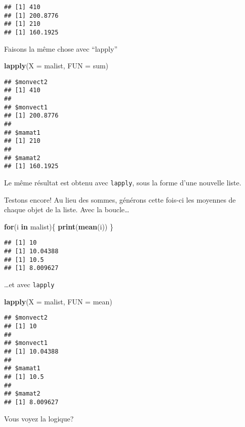 \documentclass[]{book}
\newenvironment{Shaded}{\begin{snugshade}}{\end{snugshade}}
\newcommand{\KeywordTok}[1]{\textcolor[rgb]{0.13,0.29,0.53}{\textbf{#1}}}
\newcommand{\DataTypeTok}[1]{\textcolor[rgb]{0.13,0.29,0.53}{#1}}
\newcommand{\ControlFlowTok}[1]{\textcolor[rgb]{0.13,0.29,0.53}{\textbf{#1}}}
\newcommand{\NormalTok}[1]{#1}
\begin{document}
\begin{verbatim}
## [1] 410
## [1] 200.8776
## [1] 210
## [1] 160.1925
\end{verbatim}

Faisons la même chose avec ``lapply''

\begin{Shaded}
\begin{Highlighting}[]
\KeywordTok{lapply}\NormalTok{(}\DataTypeTok{X =}\NormalTok{ malist, }\DataTypeTok{FUN =}\NormalTok{ sum)}
\end{Highlighting}
\end{Shaded}

\begin{verbatim}
## $monvect2
## [1] 410
## 
## $monvect1
## [1] 200.8776
## 
## $mamat1
## [1] 210
## 
## $mamat2
## [1] 160.1925
\end{verbatim}

Le même résultat est obtenu avec \texttt{lapply}, sous la forme d'une
nouvelle liste.

Testons encore! Au lieu des sommes, générons cette fois-ci les moyennes
de chaque objet de la liste. Avec la boucle\ldots{}

\begin{Shaded}
\begin{Highlighting}[]
\ControlFlowTok{for}\NormalTok{(i }\ControlFlowTok{in}\NormalTok{ malist)\{}
  \KeywordTok{print}\NormalTok{(}\KeywordTok{mean}\NormalTok{(i))}
\NormalTok{  \}}
\end{Highlighting}
\end{Shaded}

\begin{verbatim}
## [1] 10
## [1] 10.04388
## [1] 10.5
## [1] 8.009627
\end{verbatim}

\ldots{}et avec \texttt{lapply}

\begin{Shaded}
\begin{Highlighting}[]
\KeywordTok{lapply}\NormalTok{(}\DataTypeTok{X =}\NormalTok{ malist, }\DataTypeTok{FUN =}\NormalTok{ mean)}
\end{Highlighting}
\end{Shaded}

\begin{verbatim}
## $monvect2
## [1] 10
## 
## $monvect1
## [1] 10.04388
## 
## $mamat1
## [1] 10.5
## 
## $mamat2
## [1] 8.009627
\end{verbatim}

Vous voyez la logique?
\end{document}
